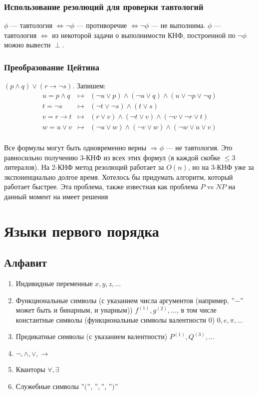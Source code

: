 
\subsubsection{Использование резолюций для проверки тавтологий}
$\phi$ --- тавтология $\Leftrightarrow \neg \phi$ --- противоречие $\Leftrightarrow \neg \phi$ --- не выполнима.
$\phi$ --- тавтология $\Leftrightarrow$ из некоторой задачи о выполнимости КНФ, построенной по $\neg \phi$ можно вывести $\perp$. 

\subsubsection{Преобразование Цейтина}
\begin{example}
    $(p \wedge q) \vee (r \rightarrow \neg s)$. Запишем:
    $$\begin{array}{ccc}
        u = p \wedge q & \mapsto & (\neg u \vee p) \wedge (\neg u \vee q) \wedge (u \vee \neg p \vee \neg q)\\
        t = \neg s & \mapsto & (\neg t \vee \neg s) \wedge (t \vee s)\\
        v = r \rightarrow t & \mapsto & (r \vee v) \wedge (\neg t \vee v) \wedge (\neg v \vee \neg r \vee t)\\
        w = u \vee v & \mapsto & (\neg u \vee w) \wedge (\neg v \vee w) \wedge (\neg w \vee u \vee v)\\
    \end{array}$$
\end{example}

Все формулы могут быть одновременно верны $\Rightarrow \phi$ --- не тавтология. Это равносильно получению 3-КНФ из всех этих формул (в каждой скобке $\le 3$ литералов). На 2-КНФ метод резолюций работает за $O(n)$, но на 3-КНФ уже за экспоненциально долгое время. Хотелось бы придумать алгоритм, который работает быстрее. Эта проблема, также известная как проблема $P$ vs $NP$ на данный момент на имеет решения

\section{Языки первого порядка}
\subsection{Алфавит}
\begin{enumerate}
    \item Индивидные переменные $x, y, z, \dots$
    \item Функциональные символы (с указанием числа аргументов (например, ''$-$'' может быть и бинарным, и унарным)) $f^{(1)}, g^{(2)}, \dots$, в том числе константные символы (функциональные символы валентности 0) $0, e, \pi, \dots$
    \item Предикатные символы (с указанием валентности) $P^{(1)}, Q^{(3)}, \dots$
    \item $\neg, \wedge, \vee, \rightarrow$
    \item Кванторы $\forall, \exists$
    \item Служебные символы ''$($'', ''$,$'', ''$)$''
\end{enumerate}

